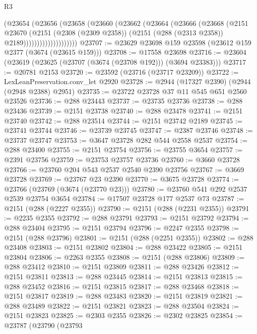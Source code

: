 \begin{lexlean}{R3}
\begin{coremodule}
                      (@23654
                        (@23656
                          (@23658
                            (@23660
                              (@23662
                                (@23664
                                  (@23666
                                    (@23668
                                      (@2151
                                        @23670
                                        (@2151
                                          (@2308 (@2309 @2358))
                                          (@2151 (@288 (@2313 @2358)) @2189))))))))))))))))))))
@23707 := @23629 @23698 @159 @23598 (@23612 @159 @2377 (@3674 (@23615 @159)))
@23708 := @17558 @23698
@23716 := @23604 (@23619 (@23625 (@23707 (@3674 (@23708 @192))) (@3694 @23383)))
@23717 := @20781 @2153
@23720 := @23592 (@23716 (@23717 @23209))
@23722 := LexLeanPreservation.conv_let @2920
@23728 := @2944 (@17327 @2390) (@2944 (@2948 @2388) @2951)
@23735 := @23722 @23728 @37 @11 @545 @651 @2560 @23526
@23736 := @288 @23443
@23737 := @23735 @23736
@23738 := @288 @23436
@23739 := @2151 @23738
@23740 := @288 @23478
@23741 := @2151 @23740
@23742 := @288 @23514
@23744 := @2151 @23742 @2189
@23745 := @23741 @23744
@23746 := @23739 @23745
@23747 := @2387 @23746
@23748 := @23737 @23747
@23753 := @3647 @23728 @282 @544 @2558 @2537
@23754 := @288 @23400
@23755 := @2151 @23754
@23756 := @23755 @3654
@23757 := @2391 @23756
@23759 := @23753 @23757 @23736
@23760 := @3660 @23728
@23766 := @23760 @204 @543 @2537 @2540 @2390 @23756
@23767 := @3669 @23728
@23769 := @23767 @23 @2390
@23770 := @3675 @23728
@23774 := @23766 (@23769 (@3674 (@23770 @23)))
@23780 := @23760 @541 @292 @2537 @2539 @23754 @3654
@23784 := @17507 @23728 @177 @2537 @73
@23787 := @2151 (@288 (@2227 @2355))
@23790 := @2151 (@288 (@2231 @2355))
@23791 := @2235 @2355
@23792 := @288 @23791
@23793 := @2151 @23792
@23794 := @288 @23404
@23795 := @2151 @23794
@23796 := @2247 @2355
@23798 := @2151 (@288 @23796)
@23801 := @2151 (@288 (@2251 @2355))
@23802 := @288 @23408
@23803 := @2151 @23802
@23804 := @288 @23422
@23805 := @2151 @23804
@23806 := @2263 @2355
@23808 := @2151 (@288 @23806)
@23809 := @288 @23412
@23810 := @2151 @23809
@23811 := @288 @23426
@23812 := @2151 @23811
@23813 := @288 @23445
@23814 := @2151 @23813
@23815 := @288 @23452
@23816 := @2151 @23815
@23817 := @288 @23468
@23818 := @2151 @23817
@23819 := @288 @23483
@23820 := @2151 @23819
@23821 := @288 @23489
@23822 := @2151 @23821
@23823 := @288 @23504
@23824 := @2151 @23823
@23825 := @2303 @2355
@23826 := @2302 @23825
@23854 := @23787
    (@23790
      (@23793

\end{coremodule}
\end{lexlean}
